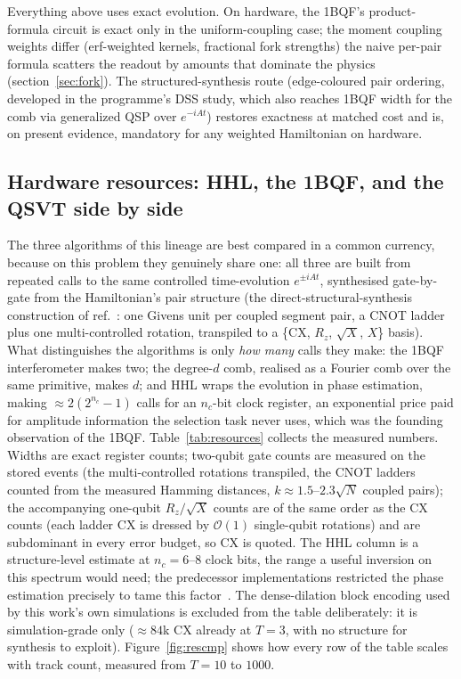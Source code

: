 \documentclass[11pt,a4paper]{article}
\begin{document}
Everything above uses exact evolution. On hardware, the 1BQF's
product-formula circuit is exact only in the uniform-coupling case;
the moment coupling weights differ (erf-weighted kernels,
fractional fork strengths) the naive per-pair formula scatters the
readout by amounts that dominate the physics
(section~\ref{sec:fork}). The structured-synthesis route
(edge-coloured pair ordering, developed in the programme's DSS
study, which also reaches 1BQF width for the comb via generalized
QSP over $e^{-iAt}$) restores exactness at matched cost and is, on
present evidence, mandatory for any weighted Hamiltonian on
hardware.

\subsection{Hardware resources: HHL, the 1BQF, and the QSVT side by
side}
\label{sec:limits:resources}

The three algorithms of this lineage are best compared in a common
currency, because on this problem they genuinely share one: all
three are built from repeated calls to the same controlled
time-evolution $e^{\pm iAt}$, synthesised gate-by-gate from the
Hamiltonian's pair structure (the direct-structural-synthesis
construction of ref.~\cite{trackhhl}: one Givens unit per coupled
segment pair, a CNOT ladder plus one multi-controlled rotation,
transpiled to a \{CX, $R_z$, $\sqrt X$, $X$\} basis). What
distinguishes the algorithms is only \emph{how many} calls they
make: the 1BQF interferometer makes two; the degree-$d$ comb,
realised as a Fourier comb over the same primitive, makes $d$; and
HHL wraps the evolution in phase estimation, making
$\approx2(2^{n_c}{-}1)$ calls for an $n_c$-bit clock register, an exponential price paid for amplitude information the selection
task never uses, which was the founding observation of the 1BQF.
Table~\ref{tab:resources} collects the measured numbers. Widths are
exact register counts; two-qubit gate counts are measured on the
stored events (the multi-controlled rotations transpiled, the CNOT
ladders counted from the measured Hamming distances, $k\approx
1.5$--$2.3\sqrt{N}$ coupled pairs); the accompanying one-qubit
$R_z/\sqrt X$ counts are of the same order as the CX counts (each
ladder CX is dressed by $\mathcal{O}(1)$ single-qubit rotations)
and are subdominant in every error budget, so CX is quoted. The
HHL column is a structure-level estimate at $n_c=6$--$8$ clock
bits, the range a useful inversion on this spectrum would need;
the predecessor implementations restricted the phase estimation
precisely to tame this factor~\cite{nicotra2023,trackhhl_epj}.
The dense-dilation block encoding used by this work's own
simulations is excluded from the table deliberately: it is
simulation-grade only ($\approx84$k CX already at $T=3$, with no
structure for synthesis to exploit). Figure~\ref{fig:rescmp} shows
how every row of the table scales with track count, measured from
$T=10$ to $1000$.
\end{document}
